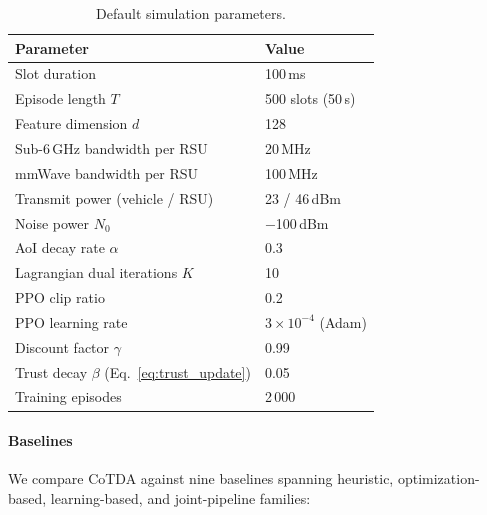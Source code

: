 \documentclass[final,3p,times,review,sort&compress]{elsarticle}
\begin{document}
\begin{table}[t!]
\centering
\caption{Default simulation parameters.}
\label{tab:sim_params}
\begin{tabularx}{\columnwidth}{lX}
\toprule
\textbf{Parameter} & \textbf{Value} \\
\midrule
Slot duration & 100\,ms \\
Episode length $T$ & 500 slots (50\,s) \\
Feature dimension $d$ & 128 \\
Sub-6\,GHz bandwidth per RSU & 20\,MHz \\
mmWave bandwidth per RSU & 100\,MHz \\
Transmit power (vehicle / RSU) & 23 / 46\,dBm \\
Noise power $N_0$ & $-$100\,dBm \\
AoI decay rate $\alpha$ & 0.3 \\
Lagrangian dual iterations $K$ & 10 \\
PPO clip ratio & 0.2 \\
PPO learning rate & $3\times10^{-4}$ (Adam) \\
Discount factor $\gamma$ & 0.99 \\
Trust decay $\beta$ (Eq.~\ref{eq:trust_update}) & 0.05 \\
Training episodes & 2\,000 \\
\bottomrule
\end{tabularx}
\end{table}

\paragraph{Baselines}
We compare CoTDA against nine baselines spanning heuristic, optimization-based, learning-based, and joint-pipeline families:
\end{document}
